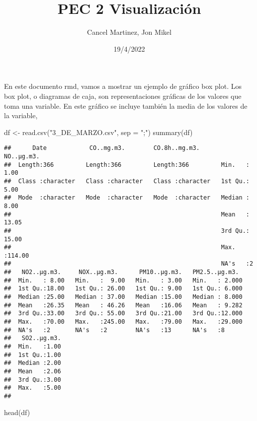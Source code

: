 \documentclass[
]{article}
\title{PEC 2 Visualización}
\author{Cancel Martinez, Jon Mikel}
\date{19/4/2022}
\newenvironment{Shaded}{\begin{snugshade}}{\end{snugshade}}
\newcommand{\AttributeTok}[1]{\textcolor[rgb]{0.77,0.63,0.00}{#1}}
\newcommand{\FunctionTok}[1]{\textcolor[rgb]{0.00,0.00,0.00}{#1}}
\newcommand{\NormalTok}[1]{#1}
\newcommand{\OtherTok}[1]{\textcolor[rgb]{0.56,0.35,0.01}{#1}}
\newcommand{\StringTok}[1]{\textcolor[rgb]{0.31,0.60,0.02}{#1}}
\begin{document}
\maketitle

En este documento rmd, vamos a mostrar un ejemplo de gráfico box plot.
Los box plot, o diagramas de caja, son representaciones gráficas de los
valores que toma una variable. En este gráfico se incluye también la
media de los valores de la variable,

\begin{Shaded}
\begin{Highlighting}[]
\NormalTok{df }\OtherTok{\textless{}{-}} \FunctionTok{read.csv}\NormalTok{(}\StringTok{"3\_DE\_MARZO.csv"}\NormalTok{, }\AttributeTok{sep =} \StringTok{";"}\NormalTok{)}
\FunctionTok{summary}\NormalTok{(df)}
\end{Highlighting}
\end{Shaded}

\begin{verbatim}
##      Date            CO..mg.m3.        CO.8h..mg.m3.        NO..µg.m3.    
##  Length:366         Length:366         Length:366         Min.   :  1.00  
##  Class :character   Class :character   Class :character   1st Qu.:  5.00  
##  Mode  :character   Mode  :character   Mode  :character   Median :  8.00  
##                                                           Mean   : 13.05  
##                                                           3rd Qu.: 15.00  
##                                                           Max.   :114.00  
##                                                           NA's   :2       
##   NO2..µg.m3.     NOX..µg.m3.      PM10..µg.m3.   PM2.5..µg.m3.   
##  Min.   : 8.00   Min.   :  9.00   Min.   : 3.00   Min.   : 2.000  
##  1st Qu.:18.00   1st Qu.: 26.00   1st Qu.: 9.00   1st Qu.: 6.000  
##  Median :25.00   Median : 37.00   Median :15.00   Median : 8.000  
##  Mean   :26.35   Mean   : 46.26   Mean   :16.06   Mean   : 9.282  
##  3rd Qu.:33.00   3rd Qu.: 55.00   3rd Qu.:21.00   3rd Qu.:12.000  
##  Max.   :70.00   Max.   :245.00   Max.   :79.00   Max.   :29.000  
##  NA's   :2       NA's   :2        NA's   :13      NA's   :8       
##   SO2..µg.m3.  
##  Min.   :1.00  
##  1st Qu.:1.00  
##  Median :2.00  
##  Mean   :2.06  
##  3rd Qu.:3.00  
##  Max.   :5.00  
## 
\end{verbatim}

\begin{Shaded}
\begin{Highlighting}[]
\FunctionTok{head}\NormalTok{(df)}
\end{Highlighting}
\end{Shaded}
\end{document}
